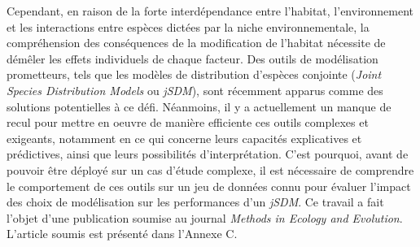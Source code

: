 Cependant, en raison de la forte interdépendance entre l'habitat,
l'environnement et les interactions entre espèces dictées par la niche
environnementale, la compréhension des conséquences de la modification
de l'habitat nécessite de démêler les effets individuels de chaque
facteur. Des outils de modélisation prometteurs, tels que les modèles de
distribution d'espèces conjointe (\emph{Joint Species Distribution
Models} ou \emph{jSDM}), sont récemment apparus comme des solutions
potentielles à ce défi. Néanmoins, il y a actuellement un manque de
recul pour mettre en oeuvre de manière efficiente ces outils complexes
et exigeants, notamment en ce qui concerne leurs capacités explicatives
et prédictives, ainsi que leurs possibilités d'interprétation. C'est
pourquoi, avant de pouvoir être déployé sur un cas d'étude complexe, il
est nécessaire de comprendre le comportement de ces outils sur un jeu de
données connu pour évaluer l'impact des choix de modélisation sur les
performances d'un \emph{jSDM}. Ce travail a fait l'objet d'une
publication soumise au journal \emph{Methods in Ecology and Evolution}.
L'article soumis est présenté dans l'Annexe C.
